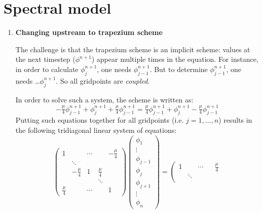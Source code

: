 \documentclass[a4paper,fleqn]{article}
\begin{document}
%
\section{Spectral model}
%
\begin{enumerate}
	\item \textbf{Changing upstream to trapezium scheme}
		\par
		The challenge is that the trapezium scheme is an implicit scheme: values at the next timestep ($\phi^{n+1}$) appear multiple times in the equation. For instance, in order to calculate $\phi^{n+1}_j$, one needs $\phi^{n+1}_{j-1}$. But to determine $\phi^{n+1}_{j-1}$, one needs \ldots $\phi^{n+1}_j$. So all gridpoints are \emph{coupled}.
		\par
		In order to solve such a system, the scheme is written as:
		\begin{equation*}
			-\tfrac{\mu}{4}\phi_{j-1}^{n+1}+\phi_j^{n+1}+\tfrac{\mu}{4}\phi_{j-1}^{n+1} = \tfrac{\mu}{4}\phi_{j-1}^{n+1}+\phi_j^{n+1}-\tfrac{\mu}{4}\phi_{j-1}^{n+1}
		\end{equation*}
		Putting such equations together for all gridpoints (i.e. $j=1,\ldots,n$) results in the following tridiagonal linear system of equations:
		\begin{equation*}
			\left(\begin{array}{ccccc}
				1 & & \cdots & & -\tfrac{\mu}{4}	\\
				&\ddots&&&	\\
					& -\tfrac{\mu}{4}	&	1	&	\tfrac{\mu}{4}	&	\\
				&&&\ddots&\\
				\tfrac{\mu}{4}	&&	\cdots	&&	1
			\end{array}\right)
			\left(\begin{array}{c}
				\phi_1	\\	\vdots \\	\phi_{j-1}	\\	\phi_{j}	\\	\phi_{j+1}	\\	\vdots \\ \phi_n
			\end{array}\right)
			=
			\left(\begin{array}{ccccc}
				1 & & \cdots & & \tfrac{\mu}{4}	\\
				&\ddots&&&	\\

\end{array}
\end{equation*}
\end{enumerate}
\end{document}

